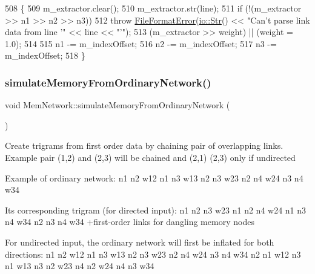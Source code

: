 \begin{DoxyCode}
508 \{
509     m\_extractor.clear();
510     m\_extractor.str(line);
511     \textcolor{keywordflow}{if} (!(m\_extractor >> n1 >> n2 >> n3))
512         \textcolor{keywordflow}{throw} \mbox{\hyperlink{classFileFormatError}{FileFormatError}}(\mbox{\hyperlink{classio_1_1Str}{io::Str}}() << \textcolor{stringliteral}{"Can't parse link data from line '"} << 
      line << \textcolor{stringliteral}{"'"});
513     (m\_extractor >> weight) || (weight = 1.0);
514 
515     n1 -= m\_indexOffset;
516     n2 -= m\_indexOffset;
517     n3 -= m\_indexOffset;
518 \}
\end{DoxyCode}
\mbox{\label{classMemNetwork_a2dd225189f5c53efd99bffacfc18bf7a}} 
\subsubsection{\texorpdfstring{simulate\+Memory\+From\+Ordinary\+Network()}{simulateMemoryFromOrdinaryNetwork()}}
{\footnotesize\ttfamily void Mem\+Network\+::simulate\+Memory\+From\+Ordinary\+Network (\begin{DoxyParamCaption}{ }\end{DoxyParamCaption})\hspace{0.3cm}{\ttfamily [protected]}}

Create trigrams from first order data by chaining pair of overlapping links. Example pair (1,2) and (2,3) will be chained and (2,1) (2,3) only if undirected

Example of ordinary network\+: n1 n2 w12 n1 n3 w13 n2 n3 w23 n2 n4 w24 n3 n4 w34

Its corresponding trigram (for directed input)\+: n1 n2 n3 w23 n1 n2 n4 w24 n1 n3 n4 w34 n2 n3 n4 w34 +first-\/order links for dangling memory nodes

For undirected input, the ordinary network will first be inflated for both directions\+: n1 n2 w12 n1 n3 w13 n2 n3 w23 n2 n4 w24 n3 n4 w34 n2 n1 w12 n3 n1 w13 n3 n2 w23 n4 n2 w24 n4 n3 w34


